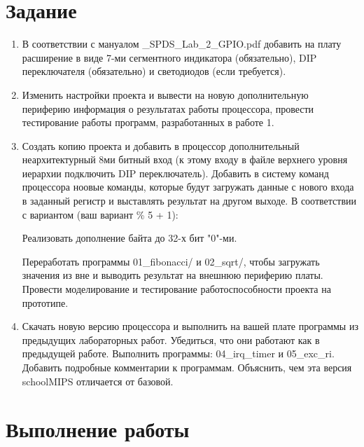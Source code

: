 \documentclass[a4paper,14pt]{article}
\begin{document}
    
    \tableofcontents
    \pagebreak


    \section{Задание}

    \begin{enumerate}
        \item В соответствии с мануалом \_SPDS\_Lab\_2\_GPIO.pdf добавить на плату расширение в виде 7-ми сегментного индикатора (обязательно), DIP переключателя (обязательно) и светодиодов (если требуется).

        \item Изменить настройки проекта и вывести на новую дополнительную периферию информация о результатах работы процессора, провести тестирование работы программ, разработанных в работе 1.

        \item Создать копию проекта и добавить в процессор дополнительный неархитектурный 8ми битный вход (к этому входу в файле верхнего уровня иерархии подключить DIP переключатель). Добавить в систему команд процессора ноовые команды, которые будут загружать данные с нового входа в заданный регистр и выставлять результат на другом выходе. В соответствии с вариантом (ваш вариант \% 5 + 1):

        Реализовать дополнение байта до 32-х бит "0"-ми.

        Переработать программы 01\_fibonacci/ и 02\_sqrt/, чтобы загружать значения из вне и выводить результат на внешнюю периферию платы. Провести моделирование и тестирование работоспособности проекта на прототипе.

        \item Скачать новую версию процессора и выполнить на вашей плате программы из предыдущих лабораторных работ. Убедиться, что они работают как в предыдущей работе. Выполнить программы: 04\_irq\_timer и 05\_exc\_ri. Добавить подробные комментарии к программам. Объяснить, чем эта версия schoolMIPS отличается от базовой.
    \end{enumerate}



    \section{Выполнение работы}
\end{document}
